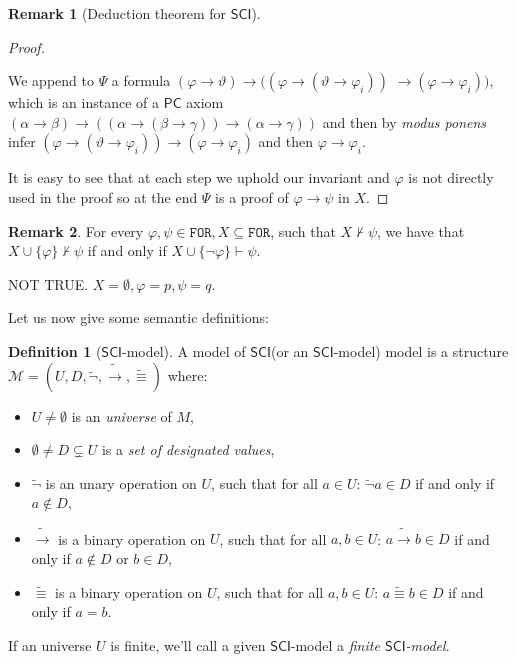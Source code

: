 \documentclass{article}
\theoremstyle{definition}
\newtheorem{definition}{Definition}[section]
\theoremstyle{definition}
\theoremstyle{definition}
\newtheorem{remark}{Remark}[section]
\newcommand*{\id}{\equiv}
\newcommand*{\ra}{\rightarrow}
\newcommand*{\FOR}{\texttt{FOR}}
\newcommand{\SCI}{$\mathsf{SCI}$\xspace}
\newcommand{\PC}{$\mathsf{PC}$\xspace}
\begin{document}
\begin{remark}[Deduction theorem for \SCI]
\begin{proof}
\begin{itemize}
                  We append to $\Psi$ a formula $(\varphi \ra \vartheta) \ra( (\varphi \ra
                      (\vartheta \ra \varphi_i))$ $ \ra (\varphi \ra \varphi_i) )$, which is an
                  instance of a \PC axiom $(\alpha \ra \beta) \ra ( (\alpha \ra (\beta \ra
                      \gamma)) \ra (\alpha \ra \gamma) )$ and then by \emph{modus ponens} infer
                  $(\varphi \ra (\vartheta \ra \varphi_i)) \ra (\varphi \ra \varphi_i)$ and then
                  $\varphi \ra \varphi_i$.
        \end{itemize}

        It is easy to see that at each step we uphold our invariant and $\varphi$ is
        not directly used in the proof so at the end $\Psi$ is a proof of $\varphi \ra
            \psi$ in $X$.

    \end{proof}
\end{remark}

{
\color{red}

\begin{remark}
    For every $\varphi, \psi \in \FOR, X \subseteq \FOR$, such that $X \not \vdash \psi$, we have that $X \cup \{\varphi\} \not \vdash \psi$ if and only if $X \cup \{\lnot \varphi\} \vdash \psi$.

    NOT TRUE. $X = \emptyset, \varphi = p, \psi = q$.

\end{remark}
}

Let us now give some semantic definitions:

\begin{definition}[\SCI-model]
    A model of \SCI (or an \SCI-model) model is a structure $\mathcal{M} = (U, D, \tilde{\lnot}, \tilde{\ra}, \tilde{\id})$ where:
    \begin{itemize}
        \item $U \not = \emptyset$ is an \emph{universe} of $M$,
        \item $\emptyset \not = D \subsetneq U$ is a \emph{set of designated values},
        \item $\tilde{\lnot}$ is an unary operation on $U$, such that for all $a \in U$: $\tilde{\lnot}a \in D$ if and only if $a \not \in D$,
        \item $\tilde{\ra}$ is a binary operation on $U$, such that for all $a, b \in U$: $a \tilde{\ra} b \in D$ if and only if $a \not \in D$ or $b \in D$,
        \item $\tilde{\id}$ is a binary operation on $U$, such that for all $a, b \in U$: $a \tilde{\id} b \in D$ if and only if $a = b$.
    \end{itemize}
    \label{model}
\end{definition}
%
If an universe $U$ is finite, we'll call a given \SCI-model a \emph{finite
    \SCI-model}.
\end{document}
